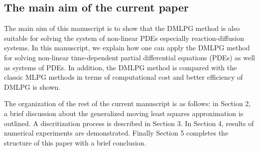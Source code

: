 \documentclass[12pt]{article}
\numberwithin{equation}{section}
\begin{document}
\subsection{The main aim of the current paper}
The main aim of this manuscript is to show that the DMLPG method is also suitable for solving the
system of non-linear PDEs especially reaction-diffusion systems. In this manuscript, we explain how one can apply the DMLPG method for solving non-linear time-dependent partial differential equations (PDEs) as well as systems of PDEs.  In addition, the DMLPG method is compared with the classic MLPG methods in terms of computational cost and better efficiency of DMLPG is shown.\par
The organization of the rest of the current manuscript is as follows: in Section 2, a brief
discussion about the generalized moving least squares approximation is outlined. A discritization process is described in Section 3. In Section 4, results of numerical experiments are
demonstrated. Finally Section 5 completes
the structure of this paper with a brief conclusion.
\end{document}
